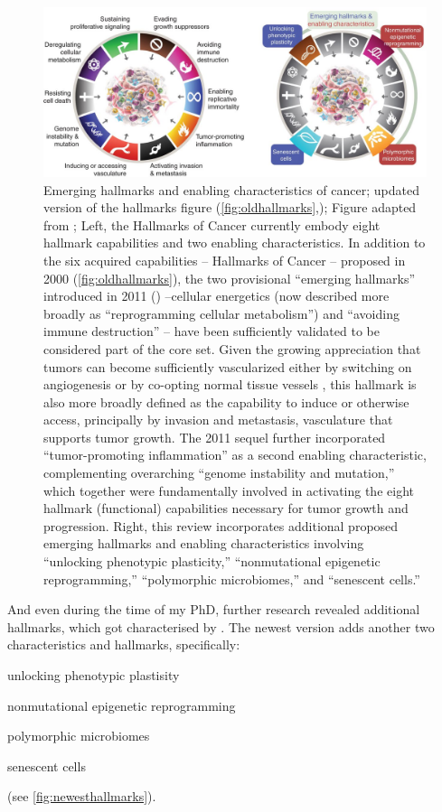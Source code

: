 \begin{figure}[!ht]
\centering
\includegraphics[width=.95\linewidth]{Figures/newestHallmarksOfCancer.jpg}
\caption[Newest hallmarks of cancer]{Emerging hallmarks and enabling characteristics of cancer; updated version of the hallmarks figure (\autoref{fig:oldhallmarks},\cite{Hanahan2000}); Figure adapted from \protect\citeauthor*{Hanahan2022}\protect\cite{Hanahan2022}; Left, the Hallmarks of Cancer currently embody eight hallmark capabilities and two enabling characteristics. In addition to the six acquired capabilities -- Hallmarks of Cancer -- proposed in 2000 (\autoref{fig:oldhallmarks}), the two provisional “emerging hallmarks” introduced in 2011 (\cite{Hanahan2011}) --cellular energetics (now described more broadly as “reprogramming cellular metabolism”) and “avoiding immune destruction” -- have been sufficiently validated to be considered part of the core set. Given the growing appreciation that tumors can become sufficiently vascularized either by switching on angiogenesis or by co-opting normal tissue vessels \cite{Kuczynski2019}, this hallmark is also more broadly defined as the capability to induce or otherwise access, principally by invasion and metastasis, vasculature that supports tumor growth. The 2011 sequel further incorporated “tumor-promoting inflammation” as a second enabling characteristic, complementing overarching “genome instability and mutation,” which together were fundamentally involved in activating the eight hallmark (functional) capabilities necessary for tumor growth and progression. Right, this review incorporates additional proposed emerging hallmarks and enabling characteristics involving “unlocking phenotypic plasticity,” “nonmutational epigenetic reprogramming,” “polymorphic microbiomes,” and “senescent cells.”}\label{fig:newesthallmarks}
\end{figure}

And even during the time of my PhD, further research revealed additional hallmarks, which got characterised by \textcite{Hanahan2022}. The newest version adds another two characteristics and hallmarks, specifically:
\begin{enumerate*}
\item unlocking phenotypic plastisity 
\item nonmutational epigenetic reprogramming
\item polymorphic microbiomes
\item senescent cells
\end{enumerate*} 
(see \autoref{fig:newesthallmarks}).

